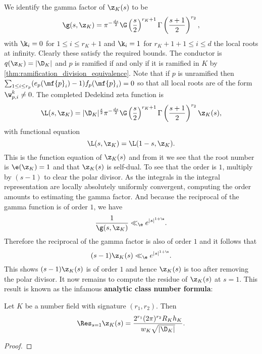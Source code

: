     \subsection*{}
       We identify the gamma factor of $\z_{K}(s)$ to be
      \[
        \g(s,\z_{K}) = \pi^{-\frac{ds}{2}}\G\left(\frac{s}{2}\right)^{r_{K}+1}\Gamma\left(\frac{s+1}{2}\right)^{r_{2}},
      \]
      with $\k_{i} = 0$ for $1 \le i \le r_{K}+1$ and $\k_{i} = 1$ for $r_{K}+1+1 \le i \le d$ the local roots at infinity. Clearly these satisfy the required bounds. The conductor is $q(\z_{K}) = |\D_{K}|$ and $p$ is ramified if and only if it is ramified in $K$ by \cref{thm:ramification_division_equivalence}. Note that if $p$ is unramified then $\sum_{1 \le i \le r_{p}}(e_{p}(\mf{p}_{i})-1)f_{p}(\mf{p}_{i}) = 0$ so that all local roots are of the form $\w_{p,i}^{k} \neq 0$. The completed Dedekind zeta function is
      \[
        \L(s,\z_{K}) = |\D_{K}|^{\frac{s}{2}}\pi^{-\frac{ds}{2}}\G\left(\frac{s}{2}\right)^{r_{K}+1}\Gamma\left(\frac{s+1}{2}\right)^{r_{2}}\z_{K}(s),
      \]
      with functional equation
      \[
        \L(s,\z_{K}) = \L(1-s,\z_{K}).
      \]
      This is the function equation of $\z_{K}(s)$ and from it we see that the root number is $\e(\z_{K}) = 1$ and that $\z_{K}(s)$ is self-dual. To see that the order is $1$, multiply by $(s-1)$ to clear the polar divisor. As the integrals in the integral representation are locally absolutely uniformly convergent, computing the order amounts to estimating the gamma factor. And because the reciprocal of the gamma function is of order $1$, we have
      \[
        \frac{1}{\g(s,\z_{K})} \ll_{\e} e^{|s|^{1+\e}}.
      \]
      Therefore the reciprocal of the gamma factor is also of order $1$ and it follows that
      \[
        (s-1)\z_{K}(s) \ll_{\e} e^{|s|^{1+\e}}.
      \]
      This shows $(s-1)\z_{K}(s)$ is of order $1$ and hence $\z_{K}(s)$ is too after removing the polar divisor. It now remains to compute the residue of $\z_{K}(s)$ at $s = 1$. This result is known as the infamous \textbf{analytic class number formula}:

      \begin{theorem}
        Let $K$ be a number field with signature $(r_{1},r_{2})$. Then
        \[
          \Res_{s = 1}\z_{K}(s) = \frac{2^{r_{1}}(2\pi)^{r_{2}}R_{K}h_{K}}{w_{K}\sqrt{|\D_{K}|}}.
        \]
      \end{theorem}
      \begin{proof}
      \end{proof}

